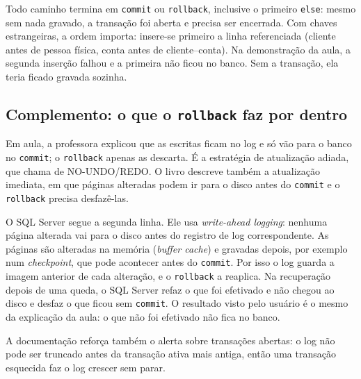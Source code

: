 Todo caminho termina em \texttt{commit} ou \texttt{rollback}, inclusive
o primeiro \texttt{else}: mesmo sem nada gravado, a transação foi aberta
e precisa ser encerrada. Com chaves estrangeiras, a ordem importa:
insere-se primeiro a linha referenciada (cliente antes de pessoa física,
conta antes de cliente--conta). Na demonstração da aula, a segunda
inserção falhou e a primeira não ficou no banco. Sem a transação, ela
teria ficado gravada sozinha.

\subsection*{Complemento: o que o \texttt{rollback} faz por dentro}

Em aula, a professora explicou que as escritas ficam no log e só vão
para o banco no \texttt{commit}; o \texttt{rollback} apenas as descarta.
É a estratégia de atualização adiada, que \textcite[cap. 23]{Elmasri2011}
chama de NO-UNDO/REDO. O livro descreve também a atualização imediata,
em que páginas alteradas podem ir para o disco antes do \texttt{commit}
e o \texttt{rollback} precisa desfazê-las.

O SQL Server segue a segunda linha. Ele usa
\emph{write-ahead logging}: nenhuma página alterada vai para o disco
antes do registro de log correspondente. As páginas são alteradas na
memória (\emph{buffer cache}) e gravadas depois, por exemplo num
\emph{checkpoint}, que pode acontecer antes do \texttt{commit}. Por isso
o log guarda a imagem anterior de cada alteração, e o \texttt{rollback}
a reaplica. Na recuperação depois de uma queda, o SQL Server refaz o
que foi efetivado e não chegou ao disco e desfaz o que ficou sem
\texttt{commit}. O resultado visto pelo usuário é o mesmo da explicação
da aula: o que não foi efetivado não fica no banco.

A documentação reforça também o alerta sobre transações abertas: o log
não pode ser truncado antes da transação ativa mais antiga, então uma
transação esquecida faz o log crescer sem parar.
